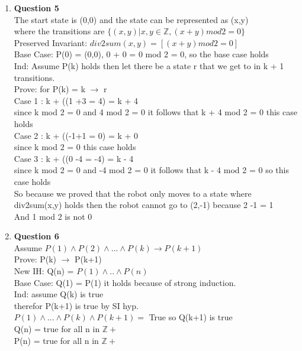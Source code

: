 \documentclass[12pt]{article}
\begin{document}
\begin{enumerate}
\item {\bf Question 5} \\
The start state is (0,0) and the state can be represented as (x,y)\\
where the transitions are $\{(x,y) | x,y \in \mathbb{Z}, (x + y) mod 2 = 0\}$ \\
Preserved Invariant: $div2sum(x,y) = [(x+y) mod 2 = 0]$ \\
Base Case: P(0) = (0,0), 0 + 0 = 0 mod 2 = 0, so the base case holds \\
Ind: Assume P(k) holds then let there be a state r that we get to in k + 1 transitions. \\
Prove: for P(k) = k $\rightarrow$ r  \\
Case 1 : k + ((1 +3 = 4) = k + 4 \\
since k mod 2 = 0 and 4 mod 2 = 0 it follows that k + 4 mod 2 = 0 this case holds\\
Case 2 : k + ((-1+1 = 0) = k + 0 \\
since k mod 2 = 0 this case holds \\  
Case 3 : k + ((0 -4 = -4) = k - 4 \\
since k mod 2 = 0 and -4 mod 2 = 0 it follows that k - 4 mod 2 = 0 so this case holds\\
So because we proved that the robot only moves to a state where div2sum(x,y) holds then the robot cannot go to (2,-1) because 2 -1 = 1 \\
And 1 mod 2 is not 0 \\

\item {\bf Question 6} \\
Assume $ P(1) \land P(2) \land ... \land P(k) \rightarrow P(k+1) $ \\
Prove: P(k) $\rightarrow$ P(k+1) \\
New IH: Q(n) = $P(1) \land .. \land P(n)$ \\
Base Case: Q(1) = P(1) it holds because of strong induction. \\
Ind: assume Q(k) is true \\
therefor P(k+1) is true by SI hyp. \\
$P(1) \land ... \land P(k) \land P(k+1) =$ True so Q(k+1) is true \\
Q(n) = true for all n in $\mathbb{Z}+$ \\
P(n) = true for all n in $\mathbb{Z}+$ \\


\end{enumerate}
\end{document}
